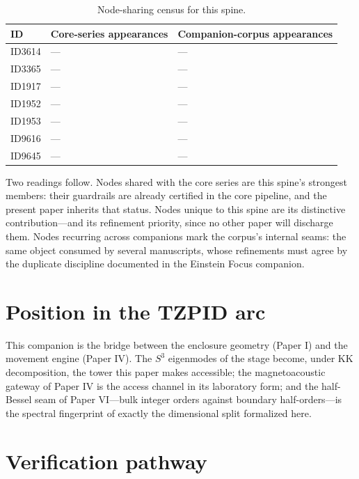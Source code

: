 \documentclass[11pt]{article}
\theoremstyle{remark}
\begin{document}
\begin{table}[ht]
\centering
\small
\caption{Node-sharing census for this spine.}
\label{tab:crosswalk}
\begin{tabular}{lp{4.4cm}p{6.6cm}}
\toprule
ID & Core-series appearances & Companion-corpus appearances \\
\midrule
ID3614 & --- & --- \\
ID3365 & --- & --- \\
ID1917 & --- & --- \\
ID1952 & --- & --- \\
ID1953 & --- & --- \\
ID9616 & --- & --- \\
ID9645 & --- & --- \\
\bottomrule
\end{tabular}
\end{table}

Two readings follow. Nodes shared with the core series are this spine's strongest members: their guardrails are already certified in the core pipeline, and the present paper inherits that status. Nodes unique to this spine are its distinctive contribution---and its refinement priority, since no other paper will discharge them. Nodes recurring across companions mark the corpus's internal seams: the same object consumed by several manuscripts, whose refinements must agree by the duplicate discipline documented in the Einstein Focus companion.

\section{Position in the TZPID arc}
\label{sec:arc}

This companion is the bridge between the enclosure geometry (Paper I) and the movement engine (Paper IV). The $S^3$ eigenmodes of the stage become, under KK decomposition, the tower this paper makes accessible; the magnetoacoustic gateway of Paper IV is the access channel in its laboratory form; and the half-Bessel seam of Paper VI---bulk integer orders against boundary half-orders---is the spectral fingerprint of exactly the dimensional split formalized here.

\section{Verification pathway}
\label{sec:verify}
\end{document}
